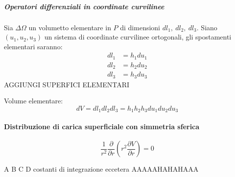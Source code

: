 \subparagraph{Operatori differenziali in coordinate curvilinee}
Sia $\Delta\Omega$ un volumetto elementare in $P$ di dimensioni $dl_1,\ dl_2,\ dl_3$.
Siano $(u_1,u_2,u_3)$ un sistema di coordinate curvilinee ortogonali, gli spostamenti elementari
saranno:
\begin{align*}
dl_1 &= h_1du_1\\
dl_2 &= h_2du_2\\
dl_3 &= h_3du_3
\end{align*}
AGGIUNGI SUPERFICI ELEMENTARI

Volume elementare:
$$
dV = dl_1dl_2dl_3 = h_1h_2h_3du_1du_2du_3
$$






\paragraph{Distribuzione di carica superficiale con simmetria sferica}
$$
\frac{1}{r^2}\frac{\partial}{\partial r} \left(r^2 \frac{\partial V}{\partial r}\right) = 0
$$

A B C D costanti di integrazione eccetera AAAAAHAHAHAAA

